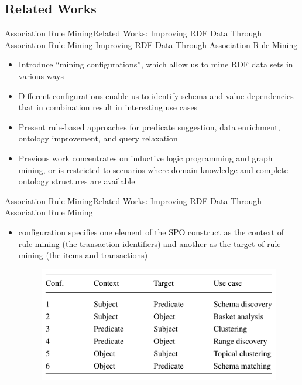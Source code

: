 \documentclass[10pt]{beamer}
\begin{document}
\subsection{Related Works}

\begin{frame}{Association Rule Mining}{Related Works:  Improving RDF Data Through Association Rule Mining}
Improving RDF Data Through Association Rule Mining \cite{abedjan2013improving}
\begin{itemize}
	
	\item Introduce “mining configurations”, which allow us to mine RDF data sets in various ways
	\item Different configurations enable us to identify schema and value dependencies that in combination result in interesting use cases
	\item Present rule-based approaches for predicate suggestion, data enrichment, ontology improvement, and query relaxation
	\item Previous work concentrates on inductive logic programming and graph mining, or is restricted to scenarios where domain knowledge and complete ontology structures are available
\end{itemize}
\end{frame}

\begin{frame}{Association Rule Mining}{Related Works:  Improving RDF Data Through Association Rule Mining}

\begin{itemize}
\item configuration specifies one element of the SPO construct as the context of rule mining (the transaction identifiers) and another as the target of rule mining (the items and transactions)

\begin{figure} 
	\includegraphics[width=.6\linewidth]{images/rule-config.PNG}
\end{figure}


\end{itemize}
\end{frame}
\end{document}
